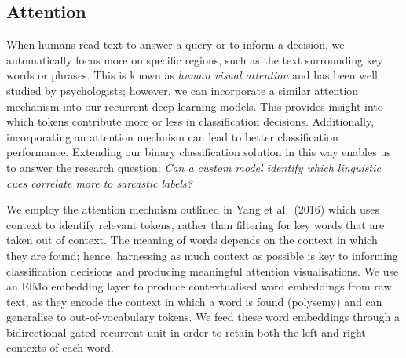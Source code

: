 \documentclass[12pt,a4paper]{article}
\begin{document}
\subsection{Attention}
\vspace{-4.2pt}
\noindent When humans read text to answer a query or to inform a decision, we automatically focus more on specific regions, such as the text surrounding key words or phrases. This is known as \textit{human visual attention} and has been well studied by psychologists; however, we can incorporate a similar attention mechanism into our recurrent deep learning models. This provides insight into which tokens contribute more or less in classification decisions. Additionally, incorporating an attention mechnism can lead to better classification performance. Extending our binary classification solution in this way enables us to answer the research question: \textit{Can a custom model identify which linguistic cues correlate more to sarcastic labels?}\\\vspace{-8pt}

\noindent We employ the attention mechnism outlined in Yang et al.\ (2016) \cite{yang2016hierarchical} which uses context to identify relevant tokens, rather than filtering for key words that are taken out of context. The meaning of words depends on the context in which they are found; hence, harnessing as much context as possible is key to informing classification decisions and producing meaningful attention visualisations. We use an ElMo embedding layer to produce contextualised word embeddings from raw text, as they encode the context in which a word is found (polysemy) and can generalise to out-of-vocabulary tokens. We feed these word embeddings through a bidirectional gated recurrent unit in order to retain both the left and right contexts of each word.\vspace{-8pt}
\end{document}
